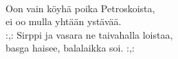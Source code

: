 \hspace{10mm} \\
            Oon vain köyhä poika Petroskoista, \\
            ei oo mulla yhtään ystävää. \\
            :,: Sirppi ja vasara ne taivahalla loistaa, \\
            basga haisee, balalaikka soi. :,: \\
\hspace{10mm} \\
            \begin{comment} Lisäsäkeistöt: \\
\hspace{10mm} \\
            Oon vain köyhä tekniikan yo, \\
            ei oo mulla yhtään ystävää. \\
            :,: Ei ole noppia eikä ole naista, \\
            eikä duunis yhtään alaista. :,: \\
\hspace{10mm} \\
            Minä asun Keravalla, \\
            siellä palvon saatanaa. \\
            :,: Ryyppyfrendin pilkoin pussiin, \\
            siksi jouduin vankilaan. :,: \\
\hspace{10mm} \\
            Reeberbahn on katu Hampurissa, \\
            Elsa siellä itseänsä myy. \\
            :,: Elsalla kävi hiton huono flaksi kun \\
            merimies taas uuden taudin toi. :,: \\
\hspace{10mm} \\
            Igorilla on panssarivaunu, \\
            sillä Igor aina ajelee. \\
            :,: Igor lähti Saksain maalle, \\
            eikä tullut koskaan takaisin. :,: \\
\hspace{10mm} \\
            Humala on paras paikka, \\

\end{comment}
